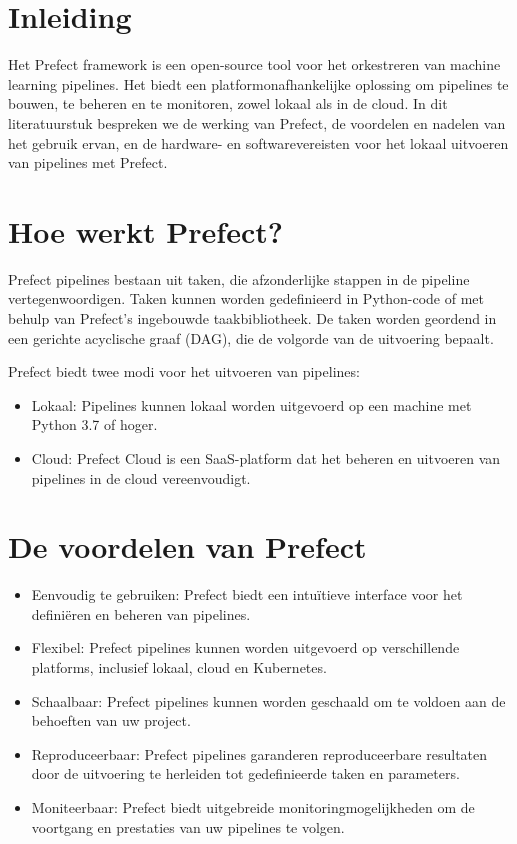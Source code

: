 \section{Inleiding}
Het Prefect framework is een open-source tool voor het orkestreren van machine learning pipelines. Het biedt een platformonafhankelijke oplossing om pipelines te bouwen, te beheren en te monitoren, zowel lokaal als in de cloud. In dit literatuurstuk bespreken we de werking van Prefect, de voordelen en nadelen van het gebruik ervan, en de hardware- en softwarevereisten voor het lokaal uitvoeren van pipelines met Prefect.

\section{Hoe werkt Prefect?}
Prefect pipelines bestaan uit taken, die afzonderlijke stappen in de pipeline vertegenwoordigen. Taken kunnen worden gedefinieerd in Python-code of met behulp van Prefect's ingebouwde taakbibliotheek. De taken worden geordend in een gerichte acyclische graaf (DAG), die de volgorde van de uitvoering bepaalt.

Prefect biedt twee modi voor het uitvoeren van pipelines:

\begin{itemize}
    \item Lokaal: Pipelines kunnen lokaal worden uitgevoerd op een machine met Python 3.7 of hoger.
    \item Cloud: Prefect Cloud is een SaaS-platform dat het beheren en uitvoeren van pipelines in de cloud vereenvoudigt.
\end{itemize}

\section{De voordelen van Prefect}
\begin{itemize}
    \item Eenvoudig te gebruiken: Prefect biedt een intuïtieve interface voor het definiëren en beheren van pipelines.
    \item Flexibel: Prefect pipelines kunnen worden uitgevoerd op verschillende platforms, inclusief lokaal, cloud en Kubernetes.
    \item Schaalbaar: Prefect pipelines kunnen worden geschaald om te voldoen aan de behoeften van uw project.
    \item Reproduceerbaar: Prefect pipelines garanderen reproduceerbare resultaten door de uitvoering te herleiden tot gedefinieerde taken en parameters.
    \item Moniteerbaar: Prefect biedt uitgebreide monitoringmogelijkheden om de voortgang en prestaties van uw pipelines te volgen.
\end{itemize}

